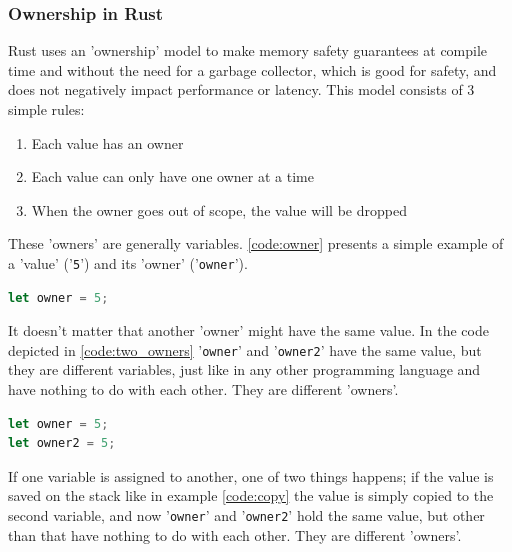 \subsubsection{Ownership in Rust}

Rust uses an 'ownership' model \cite{rust_ownership} to make memory safety guarantees at compile time and without the need for a garbage collector,
which is good for safety, and does not negatively impact performance or latency.
This model consists of 3 simple rules:
\begin{enumerate}
    \item Each value has an owner
    \item Each value can only have one owner at a time
    \item When the owner goes out of scope, the value will be dropped
\end{enumerate}

These 'owners' are generally variables. \ref{code:owner} presents a simple example of a 'value' ('\lstinline{5}') and its
'owner' ('\lstinline{owner}').\\

\begin{lstlisting}[style=colorEX,language=Rust,caption={Simple example of a value and it's owner},label={code:owner}]
let owner = 5;
\end{lstlisting}

It doesn't matter that another 'owner' might have the same value. In the code depicted in \ref{code:two_owners}
'\lstinline{owner}' and '\lstinline{owner2}' have the same value, but they are different variables, just like in any
other programming language and have nothing to do with each other. They are different 'owners'.\\

\begin{minipage}{\textwidth}
\begin{lstlisting}[style=colorEX,language=Rust,caption={Simple example of two owners},label={code:two_owners}]
let owner = 5;
let owner2 = 5;
\end{lstlisting}
\end{minipage}


If one variable is assigned to another, one of two things happens; if the value is saved on the stack like in
example \ref{code:copy} the value is simply copied to the second variable, and now '\lstinline{owner}' and '\lstinline{owner2}'
hold the same value, but other than that have nothing to do with each other. They are different 'owners'.\\

